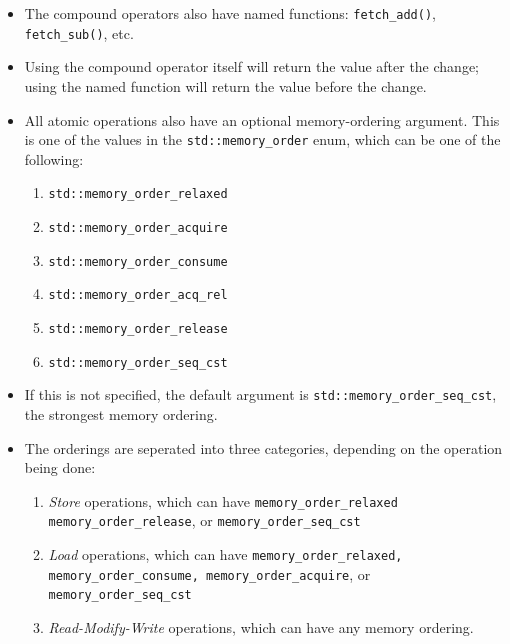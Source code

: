 \documentclass[11pt, a4paper]{article}
\theoremstyle{definition}
\theoremstyle{remark}
\newcommand{\code}[1]{\lstinline|#1|}
\begin{document}
\begin{itemize}
    \item The compound operators also have named functions: \code{fetch_add()}, \code{fetch_sub()}, etc. 
    \item Using the compound operator itself will return the value after the change; using the named function will return the value before the change. 
    \item All atomic operations also have an optional memory-ordering argument. This is one of the values in the \code{std::memory_order} enum, which can be one of the following: 
    \begin{enumerate}
        \item \code{std::memory_order_relaxed}
        \item \code{std::memory_order_acquire}
        \item \code{std::memory_order_consume}
        \item \code{std::memory_order_acq_rel}
        \item \code{std::memory_order_release}
        \item \code{std::memory_order_seq_cst}
    \end{enumerate}
    \item If this is not specified, the default argument is \code{std::memory_order_seq_cst}, the strongest memory ordering. 
    \item The orderings are seperated into three categories, depending on the operation being done: 
    \begin{enumerate}
        \item \textit{Store} operations, which can have \code{memory_order_relaxed memory_order_release}, or \code{memory_order_seq_cst}
        \item \textit{Load} operations, which can have \code{memory_order_relaxed, memory_order_consume, memory_order_acquire}, or \code{memory_order_seq_cst}
        \item \textit{Read-Modify-Write} operations, which can have any memory ordering. 
    \end{enumerate}
\end{itemize}
\end{document}
